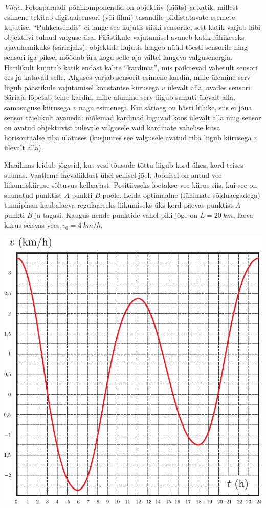 \documentclass[10pt]{article}
\begin{document}
{\emph{Vihje}. 
Fotoaparaadi põhikomponendid on objektiiv (lääts) ja katik, millest
esimene tekitab digitaalsensori (või filmi) tasandile pildistatavate esemete kujutise. \enquote{Puhkeasendis} ei lange see kujutis siiski sensorile, sest katik varjab
läbi objektiivi tulnud valguse ära. Päästikule vajutamisel avaneb katik lühikeseks ajavahemikuks (säriajaks): objektide kujutis langeb nüüd tõesti sensorile
ning sensori iga piksel mõõdab ära kogu selle aja vältel langeva valgusenergia.
Harilikult kujutab katik endast kahte \enquote{kardinat}, mis paiknevad vahetult sensori ees ja katavad selle. Alguses varjab sensorit esimene kardin, mille ülemine
serv liigub päästikule vajutamisel konstantse kiirusega $v$ ülevalt alla, avades
sensori. Säriaja lõpetab teine kardin, mille alumine serv liigub samuti ülevalt
alla, samasuguse kiirusega $v$ nagu esimenegi. Kui säriaeg on hästi lühike, siis
ei jõua sensor täielikult avaneda: mõlemad kardinad liiguvad koos ülevalt alla
ning sensor on avatud objektiivist tulevale valgusele vaid kardinate vahelise
kitsa horisontaalse riba ulatuses (kusjuures see valgusele avatud riba liigub
kiirusega $v$ ülevalt alla).
\probend
\bigskip


Maailmas leidub jõgesid, kus vesi tõusude tõttu liigub kord ühes, kord teises suunas. Vaatleme laevaliiklust ühel sellisel jõel. Joonisel on antud vee liikumiskiiruse sõltuvus kellaajast. Positiivseks loetakse vee kiirus siis, kui see on suunatud punktist $A$ punkti $B$ poole. Leida optimaalne (lühimate sõiduaegadega) tunniplaan kaubalaeva regulaarseks liikumiseks üks kord päevas punktist $A$ punkti $B$ ja tagasi. Kaugus nende punktide vahel piki jõge on $L = \SI{20}{km}$, laeva kiirus seisvas vees $v_0 = \SI{4}{km/h}$.

\begin{center}
	\includegraphics[width=0.7\linewidth]{2007-v3g-05-yl}
\end{center}
\probend
\bigskip

}
\end{document}
